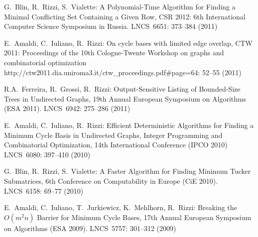 \begin{etaremune}
\vspace{-1.8mm}
  \item {G.~Blin, R.~Rizzi, S.~Vialette:}
   \newblock A Polynomial-Time Algorithm for Finding a Minimal Conflicting Set Containing a Given Row,
   \newblock CSR 2012: 6th International Computer Science Symposium in Russia.
   \newblock LNCS~6651: 373--384 (2011)

\vspace{-1.8mm}
  \item {E.~Amaldi, C.~Iuliano, R.~Rizzi:}
   \newblock On cycle bases with limited edge overlap,
   \newblock CTW 2011: Proceedings of the 10th Cologne-Twente Workshop on graphs and combinatorial optimization
   \newblock http://ctw2011.dia.uniroma3.it/ctw\_proceedings.pdf\#page=64: 52--55 (2011)

\vspace{-1.8mm}
  \item {R.A.~Ferreira, R.~Grossi, R.~Rizzi:}
   \newblock Output-Sensitive Listing of Bounded-Size Trees in Undirected Graphs,
   \newblock 19th Annual European Symposium on Algorithms (ESA 2011).
   \newblock LNCS~6942: 275--286 (2011)

\vspace{-1.8mm}
  \item {E.~Amaldi, C.~Iuliano, R.~Rizzi:}
   \newblock Efficient Deterministic Algorithms for Finding a Minimum Cycle Basis in Undirected Graphs,
   \newblock Integer Programming and Combinatorial Optimization, 14th International Conference (IPCO 2010)
   \newblock LNCS~6080: 397--410 (2010)
%

\vspace{-1.8mm}
  \item {G.~Blin, R.~Rizzi, S.~Vialette:}
   \newblock A Faster Algorithm for Finding Minimum Tucker Submatrices,
   \newblock 6th Conference on Computability in Europe (CiE 2010).
   \newblock LNCS~6158: 69--77 (2010)

\vspace{-1.8mm}
  \item {E.~Amaldi, C.~Iuliano, T.~Jurkiewicz, K.~Mehlhorn, R.~Rizzi:}
   \newblock Breaking the $O(m^2n)$ Barrier for Minimum Cycle Bases,
   \newblock 17th Annual European Symposium on Algorithms (ESA 2009).
   \newblock LNCS~5757: 301--312 (2009)


\end{etaremune}
